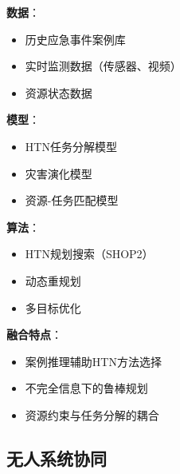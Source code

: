 \documentclass[12pt,a4paper]{ctexart}
\begin{document}
\begin{applicationbox}[应急任务规划中的三元融合]
\textbf{数据}：
\begin{itemize}
    \item 历史应急事件案例库
    \item 实时监测数据（传感器、视频）
    \item 资源状态数据
\end{itemize}

\textbf{模型}：
\begin{itemize}
    \item HTN任务分解模型
    \item 灾害演化模型
    \item 资源-任务匹配模型
\end{itemize}

\textbf{算法}：
\begin{itemize}
    \item HTN规划搜索（SHOP2）
    \item 动态重规划
    \item 多目标优化
\end{itemize}

\textbf{融合特点}：
\begin{itemize}
    \item 案例推理辅助HTN方法选择
    \item 不完全信息下的鲁棒规划
    \item 资源约束与任务分解的耦合
\end{itemize}
\end{applicationbox}

\subsection{无人系统协同}
\end{document}
